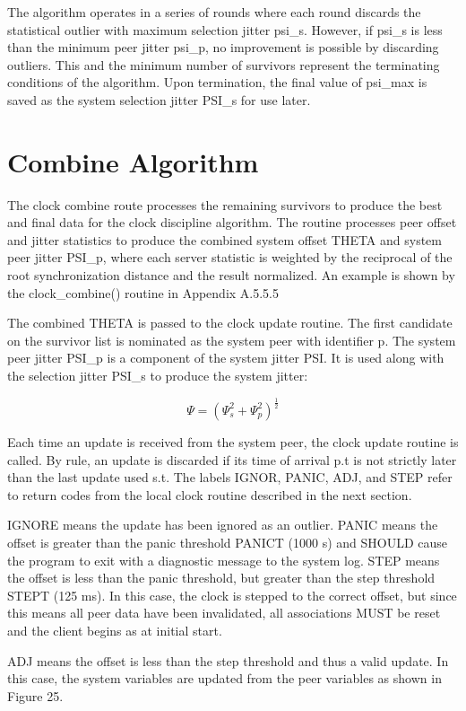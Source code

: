 The algorithm operates in a series of rounds where each round
discards the statistical outlier with maximum selection jitter psi\_s.
However, if psi\_s is less than the minimum peer jitter psi\_p, no
improvement is possible by discarding outliers.  This and the minimum
number of survivors represent the terminating conditions of the
algorithm.  Upon termination, the final value of psi\_max is saved as
the system selection jitter PSI\_s for use later.

\section{Combine Algorithm}

The clock combine route processes the remaining survivors to produce
the best and final data for the clock discipline algorithm.  The
routine processes peer offset and jitter statistics to produce the
combined system offset THETA and system peer jitter PSI\_p, where each
server statistic is weighted by the reciprocal of the root
synchronization distance and the result normalized.  An example is
shown by the clock\_combine() routine in Appendix A.5.5.5

The combined THETA is passed to the clock update routine.  The first
candidate on the survivor list is nominated as the system peer with
identifier p.  The system peer jitter PSI\_p is a component of the
system jitter PSI.  It is used along with the selection jitter PSI\_s
to produce the system jitter:

$$
\Psi = \left( \Psi_s^2 + \Psi_p^2 \right)^{\frac{1}{2}}
$$

Each time an update is received from the system peer, the clock
update routine is called.  By rule, an update is discarded if its
time of arrival p.t is not strictly later than the last update used
s.t.  The labels IGNOR, PANIC, ADJ, and STEP refer to return codes
from the local clock routine described in the next section.

IGNORE means the update has been ignored as an outlier.  PANIC means
the offset is greater than the panic threshold PANICT (1000 s) and
SHOULD cause the program to exit with a diagnostic message to the
system log.  STEP means the offset is less than the panic threshold,
but greater than the step threshold STEPT (125 ms).  In this case,
the clock is stepped to the correct offset, but since this means all
peer data have been invalidated, all associations MUST be reset and
the client begins as at initial start.

ADJ means the offset is less than the step threshold and thus a valid
update.  In this case, the system variables are updated from the peer
variables as shown in Figure 25.

